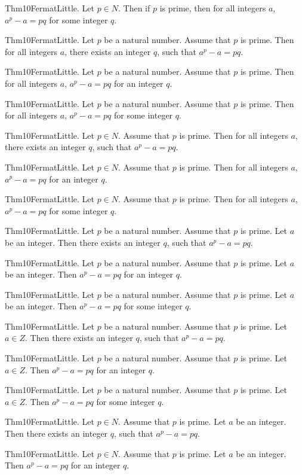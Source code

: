 \documentclass{article}
\begin{document}
Thm10FermatLittle. Let $p \in N$. Then if $p$ is prime, then for all integers $a$, $a ^ {p}- a = p q$ for some integer $q$.

Thm10FermatLittle. Let $p$ be a natural number. Assume that $p$ is prime. Then for all integers $a$, there exists an integer $q$, such that $a ^ {p}- a = p q$.

Thm10FermatLittle. Let $p$ be a natural number. Assume that $p$ is prime. Then for all integers $a$, $a ^ {p}- a = p q$ for an integer $q$.

Thm10FermatLittle. Let $p$ be a natural number. Assume that $p$ is prime. Then for all integers $a$, $a ^ {p}- a = p q$ for some integer $q$.

Thm10FermatLittle. Let $p \in N$. Assume that $p$ is prime. Then for all integers $a$, there exists an integer $q$, such that $a ^ {p}- a = p q$.

Thm10FermatLittle. Let $p \in N$. Assume that $p$ is prime. Then for all integers $a$, $a ^ {p}- a = p q$ for an integer $q$.

Thm10FermatLittle. Let $p \in N$. Assume that $p$ is prime. Then for all integers $a$, $a ^ {p}- a = p q$ for some integer $q$.

Thm10FermatLittle. Let $p$ be a natural number. Assume that $p$ is prime. Let $a$ be an integer. Then there exists an integer $q$, such that $a ^ {p}- a = p q$.

Thm10FermatLittle. Let $p$ be a natural number. Assume that $p$ is prime. Let $a$ be an integer. Then $a ^ {p}- a = p q$ for an integer $q$.

Thm10FermatLittle. Let $p$ be a natural number. Assume that $p$ is prime. Let $a$ be an integer. Then $a ^ {p}- a = p q$ for some integer $q$.

Thm10FermatLittle. Let $p$ be a natural number. Assume that $p$ is prime. Let $a \in Z$. Then there exists an integer $q$, such that $a ^ {p}- a = p q$.

Thm10FermatLittle. Let $p$ be a natural number. Assume that $p$ is prime. Let $a \in Z$. Then $a ^ {p}- a = p q$ for an integer $q$.

Thm10FermatLittle. Let $p$ be a natural number. Assume that $p$ is prime. Let $a \in Z$. Then $a ^ {p}- a = p q$ for some integer $q$.

Thm10FermatLittle. Let $p \in N$. Assume that $p$ is prime. Let $a$ be an integer. Then there exists an integer $q$, such that $a ^ {p}- a = p q$.

Thm10FermatLittle. Let $p \in N$. Assume that $p$ is prime. Let $a$ be an integer. Then $a ^ {p}- a = p q$ for an integer $q$.
\end{document}
